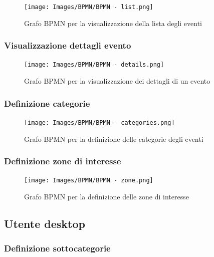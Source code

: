 \documentclass{article}
\begin{document}
\begin{figure}[htbp]
    \label{7.1.3}
    \centering
    \texttt{[image: Images/BPMN/BPMN - list.png]}
    \caption{Grafo BPMN per la visualizzazione della lista degli eventi}
\end{figure}

\clearpage

\subsubsection{Visualizzazione dettagli evento}

\begin{figure}[htbp]
    \label{7.1.4}
    \centering
    \texttt{[image: Images/BPMN/BPMN - details.png]}
    \caption{Grafo BPMN per la visualizzazione dei dettagli di un evento}
\end{figure}

\clearpage

\subsubsection{Definizione categorie}

\begin{figure}[htbp]
    \label{7.1.5}
    \centering
    \texttt{[image: Images/BPMN/BPMN - categories.png]}
    \caption{Grafo BPMN per la definizione delle categorie degli eventi}
\end{figure}

\clearpage

\subsubsection{Definizione zone di interesse}

\begin{figure}[htbp]
    \label{7.1.6}
    \centering
    \texttt{[image: Images/BPMN/BPMN - zone.png]}
    \caption{Grafo BPMN per la definizione delle zone di interesse}
\end{figure}
\clearpage

\subsection{Utente desktop}

\subsubsection{Definizione sottocategorie}
\end{document}
